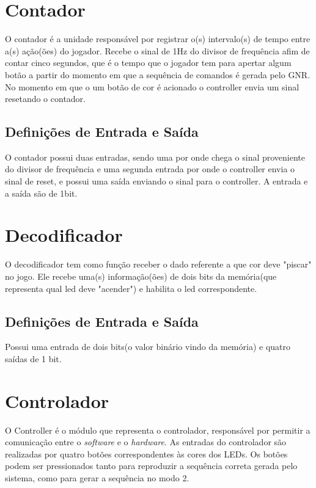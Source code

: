 \documentclass{report}
\begin{document}
  \section{Contador}
  
  O contador é a unidade responsável por registrar o(s) intervalo(s) de tempo entre a(s) ação(ões) do jogador. Recebe o sinal de 1Hz do divisor de frequência afim de contar cinco segundos, que é o tempo que o jogador tem para apertar algum botão a partir do momento em que a sequência de comandos é gerada pelo GNR. No momento em que o um botão de cor é acionado o controller envia um sinal resetando o contador.
  
    \subsection{Definições de Entrada e Saída}
    
O contador possui duas entradas, sendo uma por onde chega o sinal proveniente do divisor de frequência e uma segunda entrada por onde o controller envia o sinal de reset, e possui uma saída enviando o sinal para o controller. A entrada e a saída são de 1bit.

   
  \section{Decodificador}
  
  O decodificador tem como função receber o dado referente a que cor deve "piscar" no jogo. Ele recebe uma(s) informação(ões) de dois bits da memória(que representa qual led deve "acender") e habilita o led correspondente.
  
    \subsection{Definições de Entrada e Saída}
    Possui uma entrada de dois bits(o valor binário vindo da memória) e quatro saídas de 1 bit.
    \paragraph{}
    
    
 \section{Controlador}
 O Controller é o módulo que representa o controlador, responsável por permitir a comunicação entre o \textit{software} e o \textit{hardware}. 
 As entradas do controlador são realizadas por quatro botões correspondentes às cores dos LEDs. Os botões podem ser pressionados tanto para reproduzir a sequência correta gerada pelo sistema, como para gerar a sequência no modo 2.
\end{document}
